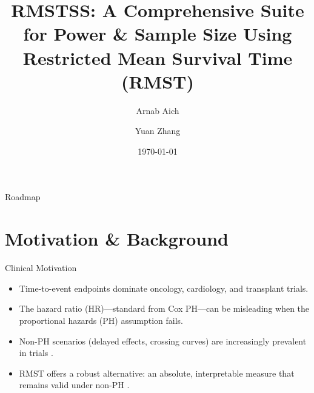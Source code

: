 \documentclass{beamer}
\title[RMSTSS]{RMSTSS: A Comprehensive Suite for Power \& Sample Size Using Restricted Mean Survival Time (RMST)}
\author[Arnab Aich, Yuan Zhang]{Arnab Aich \and Yuan Zhang}
\institute[UTHSC]{Department of Preventive Medicine, UTHSC}
\date{\today}
\begin{document}
\begin{frame}
  \titlepage
\end{frame}

\begin{frame}{Roadmap}
\tableofcontents
\end{frame}

\section{Motivation \& Background}

\begin{frame}{Clinical Motivation}
\begin{itemize}
  \item Time-to-event endpoints dominate oncology, cardiology, and transplant trials.
  \item The hazard ratio (HR)—standard from Cox PH—can be misleading when the proportional hazards (PH) assumption fails.
  \item Non-PH scenarios (delayed effects, crossing curves) are increasingly prevalent in trials \cite{PHViolations2024}.
  \item RMST offers a robust alternative: an absolute, interpretable measure that remains valid under non-PH \cite{RoystonParmar2013,Uno2014}.
\end{itemize}
\end{frame}
\end{document}
